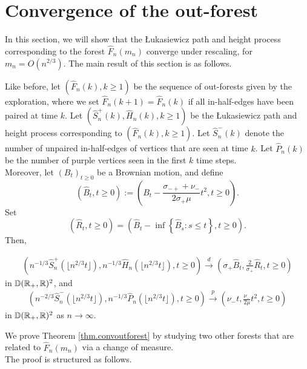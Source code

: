 \section{Convergence of the out-forest}\label{sec.convoutforest}
In this section, we will show that the \L ukasiewicz path and height process corresponding to the forest $\hat{F}_n(m_n)$ converge under rescaling, for $m_n=O(n^{2/3})$. 
The main result of this section is as follows. 

\begin{theorem}\label{thm.convoutforest}
Like before, let $(\hat{F}_n(k),k\geq 1)$ be the sequence of out-forests given by the exploration, where we set $\hat{F}_n(k+1)=\hat{F}_n(k)$ if all in-half-edges have been paired at time $k$. Let $(\hat{S}^{+}_n(k),\hat{H}_n(k),k\geq 1)$ be the \L ukasiewicz path and height process corresponding to $(\hat{F}_n(k),k\geq 1)$. Let $\hat{S}^-_n(k)$ denote the number of unpaired in-half-edges of vertices that are seen at time $k$. Let $\hat{P}_n(k)$ be the number of purple vertices seen in the first $k$ time steps. \\
Moreover, let $(B_t)_{t\geq 0}$ be a Brownian motion, and define
$$(\hat{B}_t,t\geq 0):=\left( B_t-\frac{\sigma_{-+}+\nu_-}{2\sigma_+ \mu}t^2, t\geq 0\right).$$ 
Set $$(\hat{R}_t,t\geq 0)= \left(\hat{B}_t-\inf\left\{\hat{B}_s: s\leq t\right\},t\geq 0\right).$$
Then,

\begin{align*}\left(n^{-1/3}\hat{S}^{+}_n\left(\lfloor n^{2/3}t\rfloor \right),n^{-1/3}\hat{H}_{n}\left(\lfloor n^{2/3}t\rfloor \right), t\geq 0\right)
\overset{d}{\to}\left(\sigma_+ \hat{B}_t, \frac{2}{\sigma_+} \hat{R}_t, t\geq 0\right)\end{align*}
in ${\mathbb D}({\mathbb R}_+,{\mathbb R})^2$, and 
\begin{align*}\left( n^{-2/3}\hat{S}_n^-\left(\lfloor n^{2/3}t\rfloor \right), n^{-1/3}\hat{P}_n\left(\lfloor n^{2/3}t\rfloor \right), t\geq 0\right)\overset{p}{\to}\left(\nu_-t,  \frac{\nu_-}{2\mu} t^2, t\geq 0\right)\end{align*}
in ${\mathbb D}({\mathbb R}_+,{\mathbb R})^2$ as $n\to \infty$. 
\end{theorem}
We prove Theorem \ref{thm.convoutforest} by studying two other forests that are related to $\hat{F}_n(m_n)$ via a change of measure.  \\
The proof is structured as follows.

